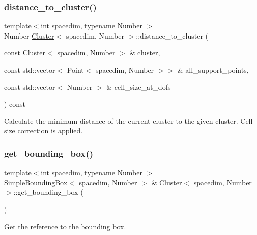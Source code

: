 \subsubsection{\texorpdfstring{distance\+\_\+to\+\_\+cluster()}{distance\_to\_cluster()}\hspace{0.1cm}{\footnotesize\ttfamily [2/2]}}
{\footnotesize\ttfamily template$<$int spacedim, typename Number $>$ \\
Number \hyperlink{classCluster}{Cluster}$<$ spacedim, Number $>$\+::distance\+\_\+to\+\_\+cluster (\begin{DoxyParamCaption}\item[{const \hyperlink{classCluster}{Cluster}$<$ spacedim, Number $>$ \&}]{cluster,  }\item[{const std\+::vector$<$ Point$<$ spacedim, Number $>$$>$ \&}]{all\+\_\+support\+\_\+points,  }\item[{const std\+::vector$<$ Number $>$ \&}]{cell\+\_\+size\+\_\+at\+\_\+dofs }\end{DoxyParamCaption}) const}

Calculate the minimum distance of the current cluster to the given cluster. Cell size correction is applied. \mbox{\label{classCluster_a062a81f89fcb644c98f94fdf20ebcced}} 
\subsubsection{\texorpdfstring{get\+\_\+bounding\+\_\+box()}{get\_bounding\_box()}\hspace{0.1cm}{\footnotesize\ttfamily [1/2]}}
{\footnotesize\ttfamily template$<$int spacedim, typename Number $>$ \\
\hyperlink{classSimpleBoundingBox}{Simple\+Bounding\+Box}$<$ spacedim, Number $>$ \& \hyperlink{classCluster}{Cluster}$<$ spacedim, Number $>$\+::get\+\_\+bounding\+\_\+box (\begin{DoxyParamCaption}{ }\end{DoxyParamCaption})}

Get the reference to the bounding box. \mbox{\label{classCluster_ad720b2126e07c5698c1fc39ac3f1e6a4}} 
